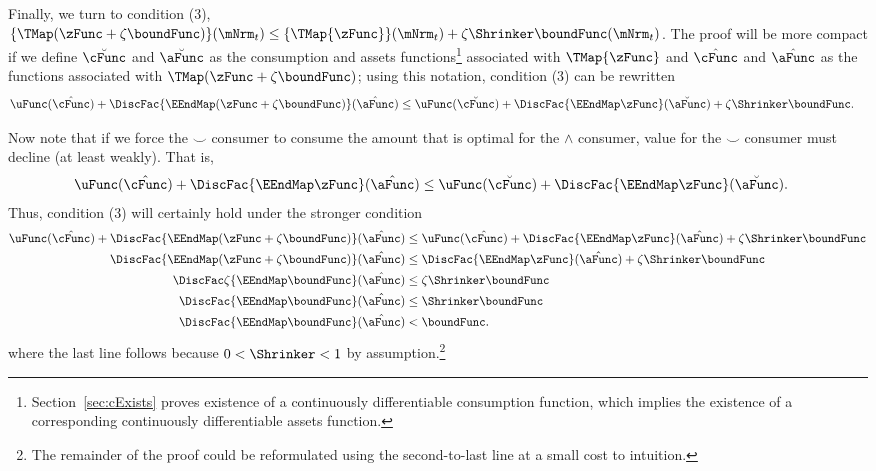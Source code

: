 \documentclass[\econtexRoot/BufferStockTheory]{subfiles}
\begin{document}
Finally, we turn to condition (3), $\{\TMap({\zFunc} +\zeta\boundFunc
)\}(\mNrm_{t}) \leq \{\TMap{\zFunc}\}(\mNrm_{t}) +\zeta \Shrinker
\boundFunc(\mNrm_{t})$. The proof will be more compact if we define
$\breve{\cFunc}$ and $\breve{\aFunc}$ as the consumption and assets
functions\footnote{Section~\ref{sec:cExists} proves existence of a
  continuously differentiable consumption function, which implies the
  existence of a corresponding continuously differentiable assets
  function.}  associated with $\TMap{\zFunc}$ and $\hat{\cFunc}$ and
$\hat{\aFunc}$ as the functions associated with $\TMap({\zFunc+\zeta
  \boundFunc})$; using this notation, condition (3) can be rewritten
\begin{align*}
  \uFunc(\hat{\cFunc})+\DiscFac \{\EEndMap (\zFunc+\zeta \boundFunc) \}(\hat{\aFunc})  & \leq  \uFunc(\breve{\cFunc})+\DiscFac \{\EEndMap \zFunc \}(\breve{\aFunc})  + \zeta \Shrinker \boundFunc.
\end{align*}

Now note that if we force the $\smile$ consumer to consume the amount that is
optimal for the $\wedge$ consumer, value for the $\smile$ consumer must decline (at least weakly).  That is,
\begin{align*}
  \uFunc(\hat{\cFunc})+\DiscFac \{\EEndMap \zFunc \}(\hat{\aFunc})  & \leq \uFunc(\breve{\cFunc})+\DiscFac \{\EEndMap \zFunc \}(\breve{\aFunc})
                                                                      .
\end{align*}
Thus, condition (3) will certainly hold under the stronger condition
\begin{align*}
  \uFunc(\hat{\cFunc})+\DiscFac\{\EEndMap (\zFunc+\zeta \boundFunc) \}(\hat{\aFunc})  & \leq  \uFunc(\hat{\cFunc})+\DiscFac\{\EEndMap \zFunc \}(\hat{\aFunc})  + \zeta \Shrinker \boundFunc
  \\ \DiscFac\{\EEndMap (\zFunc+\zeta \boundFunc) \}(\hat{\aFunc})  & \leq  \DiscFac\{\EEndMap \zFunc  \}(\hat{\aFunc})  + \zeta \Shrinker \boundFunc
  \\ \DiscFac\zeta \{\EEndMap \boundFunc \}(\hat{\aFunc})  & \leq  \zeta \Shrinker \boundFunc
  \\ \DiscFac\{\EEndMap \boundFunc \}(\hat{\aFunc})  & \leq  \Shrinker \boundFunc
  \\ \DiscFac\{\EEndMap \boundFunc \}(\hat{\aFunc})   & < \boundFunc %
                                                        .
\end{align*}
where the last line follows because $0 < \Shrinker < 1$ by assumption.\footnote{The remainder of the proof could be reformulated using the second-to-last line at a small cost to intuition.}
\end{document}

